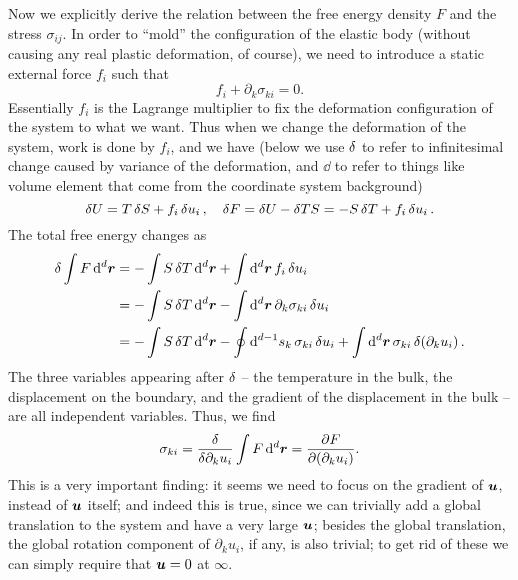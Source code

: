 \documentclass[hyperref, a4paper]{article}
\begin{document}
Now we explicitly derive the relation between the free energy density $F$
and the stress $\sigma_{ij}$.
In order to ``mold'' the configuration of the elastic body 
(without causing any real plastic deformation, of course),
we need to introduce a static external force $f_i$ such that 
\begin{equation}
    f_i + \partial_k \sigma_{ki} = 0.
\end{equation}
Essentially $f_i$ is the Lagrange multiplier 
to fix the deformation configuration of the system to what we want.
Thus when we change the deformation of the system,
work is done by $f_i$,
and we have (below we use $\var$ to refer to infinitesimal change 
caused by variance of the deformation,
and $\dd$ to refer to things like volume element 
that come from the coordinate system background)
\begin{equation}
    \var{U} = T \var{S} + f_i \var{u}_i, \quad 
    \var{F} = \var{U} - \var{TS} = - S \var{T} + f_i \var{u}_i.
\end{equation}
The total free energy changes as 
\begin{equation}
    \begin{aligned}
        \var \int F \dd[d]{\vb*{r}} &= - \int S \var{T} \dd[d]{\vb*{r}} 
        + \int \dd[d]{\vb*{r}} f_i \var{u_i}  \\
        &= - \int S \var{T} \dd[d]{\vb*{r}} 
        - \int \dd[d]{\vb*{r}} \partial_k \sigma_{ki} \var{u_i} \\
        &= - \int S \var{T} \dd[d]{\vb*{r}}
        - \oint \dd[d-1]{s_k} \sigma_{ki} \var{u_i}
        + \int \dd[d]{\vb*{r}} \sigma_{ki} \var (\partial_k u_i).
    \end{aligned}
\end{equation}
The three variables appearing after $\var$ -- the temperature in the bulk,
the displacement on the boundary,
and the gradient of the displacement in the bulk -- 
are all independent variables.
Thus, we find 
\begin{equation}
    \sigma_{ki} = \fdv{\partial_k u_i} \int F \dd[d]{\vb*{r}} = \pdv{F}{(\partial_k u_i)}.
\end{equation}
This is a very important finding:
it seems we need to focus on the gradient of $\vb*{u}$,
instead of $\vb*{u}$ itself;
and indeed this is true,
since we can trivially add a global translation to the system 
and have a very large $\vb*{u}$;
besides the global translation,
the global rotation component of $\partial_k u_i$, if any, is also trivial;
to get rid of these we can simply require that $\vb*{u} = 0$ at $\infty$.
\end{document}
